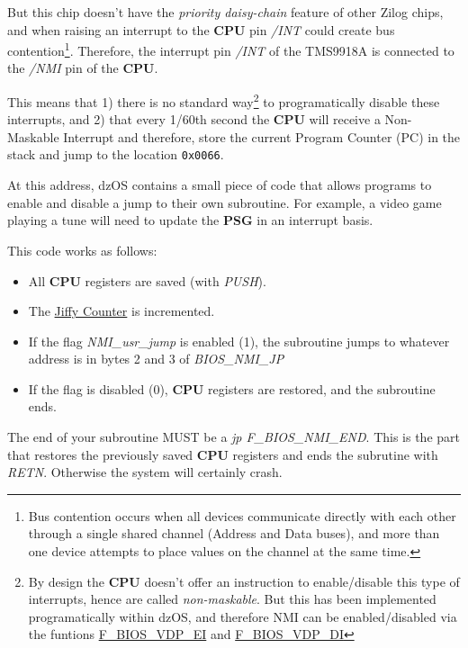 \documentclass[a4paper,11pt]{article}
\begin{document}
    But this chip doesn't have the \textit{priority daisy-chain} feature of
    other Zilog chips, and when raising an interrupt to the \textbf{CPU} pin
    \textit{/INT} could create bus contention\footnote{Bus contention occurs
    when all devices communicate directly with each other through a single
    shared channel (Address and Data buses), and more than one device attempts
    to place values on the channel at the same time.}. Therefore, the interrupt
    pin \textit{/INT} of the TMS9918A is connected to the \textit{/NMI} pin of
    the \textbf{CPU}.

    This means that 1) there is no standard way\footnote{By design the
    \textbf{CPU} doesn't offer an instruction to enable/disable this type of
    interrupts, hence are called \textit{non-maskable}. But this has been
    implemented programatically within dzOS, and therefore NMI can be
    enabled/disabled via the funtions \hyperref[func:fbiosvdpei]
    {F\_BIOS\_VDP\_EI} and \hyperref[func:fbiosvdpdi]{F\_BIOS\_VDP\_DI}} to
    programatically disable these interrupts, and 2) that every 1/60th second
    the \textbf{CPU} will receive a Non-Maskable Interrupt and therefore, store
    the current Program Counter (PC) in the stack and jump to the location
    \texttt{0x0066}.

    At this address, dzOS contains a small piece of code that allows programs to
    enable and disable a jump to their own subroutine. For example, a video game
    playing a tune will need to update the \textbf{PSG} in an interrupt basis.

    This code works as follows:

    \begin{itemize}
        \item All \textbf{CPU} registers are saved (with \textit{PUSH}).
        \item The \hyperref[subsec:jiffy_counter]{Jiffy Counter} is incremented.
        \item If the flag \textit{NMI\_usr\_jump} is enabled (1), the subroutine
        jumps to whatever address is in bytes 2 and 3 of \textit{BIOS\_NMI\_JP}
        \item If the flag is disabled (0), \textbf{CPU} registers are restored,
        and the subroutine ends.
    \end{itemize}

    The end of your subroutine MUST be a \textit{jp F\_BIOS\_NMI\_END}. This is
    the part that restores the previously saved \textbf{CPU} registers and ends
    the subrutine with \textit{RETN}. Otherwise the system will certainly crash.
\end{document}
